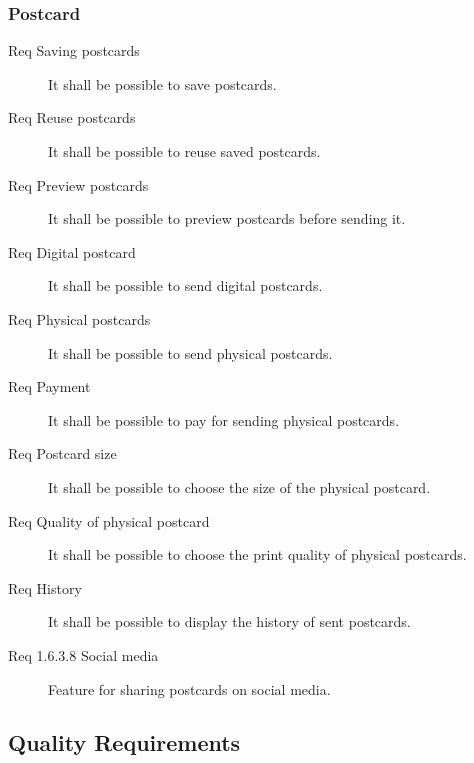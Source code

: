 \documentclass[10pt,a4paper]{article}
\begin{document}
\subsubsection{Postcard}
\begin{description}
\item [Req  Saving postcards] It shall be possible to save postcards.
\item [Req  Reuse postcards] It shall be possible to reuse saved postcards.

\item [Req  Preview postcards] It shall be possible to preview postcards before sending it.

\item [Req  Digital postcard] It shall be possible to send digital postcards.
\item [Req  Physical postcards] It shall be possible to send physical postcards.

\item [Req  Payment] It shall be possible to pay for sending physical postcards.

\item [Req  Postcard size] It shall be possible to choose the size of the physical postcard.
\item [Req  Quality of physical postcard] It shall be possible to choose the print quality of physical postcards. 
\item [Req  History] It shall be possible to display the history of sent postcards.

\item [Req 1.6.3.8 Social media] Feature for sharing postcards on social media.
\end {description}

\subsection{Quality Requirements}
\end{document}
